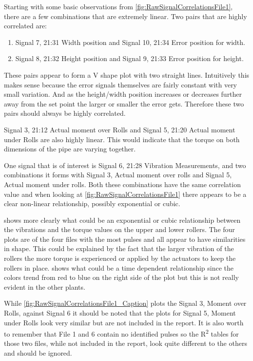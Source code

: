 \documentclass[]{article}
\begin{document}
Starting with some basic observations from \cref{fig:RawSignalCorrelationsFile1}, there are a few combinations that are extremely linear. Two pairs that are highly correlated are:
\begin{enumerate}
\item Signal 7, 21:31 Width position and Signal 10, 21:34 Error position for width.
\item Signal 8, 21:32 Height position and Signal 9, 21:33 Error position for height.
\end{enumerate}
These pairs appear to form a V shape plot with two straight lines. Intuitively this makes sense because the error signals themselves are fairly constant with very small variation. And as the height/width position increases or decreases further away from the set point the larger or smaller the error gets. Therefore these two pairs should always be highly correlated.  

Signal 3, 21:12 Actual moment over Rolls and Signal 5, 21:20 Actual moment under Rolls are also highly linear. This would indicate that the torque on both dimensions of the pipe are varying together.

One signal that is of interest is Signal 6, 21:28 Vibration Measurements, and two combinations it forms with Signal 3, Actual moment over rolls and Signal 5, Actual moment under rolls. Both these combinations have the same correlation value and when looking at \cref{fig:RawSignalCorrelationsFile1} there appears to be a clear non-linear relationship, possibly exponential or cubic.

 shows more clearly what could be an exponential or cubic relationship between the vibrations and the torque values on the upper and lower rollers. The four plots are of the four files with the most pulses and all appear to have similarities in shape. This could be explained by the fact that the larger vibration of the rollers the more torque is experienced or applied by the actuators to keep the rollers in place.  shows what could be a time dependent relationship since the colors trend from red to blue on the right side of the plot but this is not really evident in the other plants. 

While \cref{fig:RawSignalCorrelationsFile1_Caption} plots the Signal 3, Moment over Rolls, against Signal 6 it should be noted that the plots for Signal 5, Moment under Rolls look very similar but are not included in the report. It is also worth to remember that File 1 and 6 contain no identified pulses so the R\textsuperscript{2} tables for those two files, while not included in the report, look quite different to the others and should be ignored.
\end{document}
